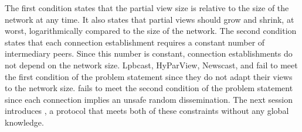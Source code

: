 The first condition states that the partial view size is relative to the size of
the network at any time. It also states that partial views should grow and
shrink, at worst, logarithmically compared to the size of the network. The
second condition states that each connection establishment requires a constant
number of intermediary peers. Since this number is constant, connection
establishments do not depend on the network size.
Lpbcast, HyParView, Newscast, and \CYCLON fail to meet the first
condition of the problem statement since they do not adapt their views
to the network size. \SCAMP fails to meet the second condition of the
problem statement since each connection implies an unsafe random
dissemination. The next session introduces \SPRAY, a protocol that
meets both of these constraints without any global knowledge.


